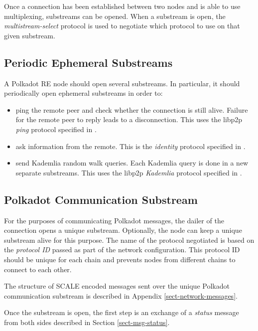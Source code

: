 \documentclass{book}
\newcommand{\tmem}[1]{{\em #1\/}}
\newcommand{\tmtextit}[1]{{\itshape{#1}}}
\providecommand{\tmem}[1]{\tmtextit{#1}}
\providecommand{\tmtextit}[1]{\tmtextit{#1}}
\begin{document}
Once a connection has been established between two nodes and is able to use
multiplexing, substreams can be opened. When a substream is open, the
{\tmem{multistream-select}} protocol is used to negotiate which protocol to
use on that given substream.

\subsection{Periodic Ephemeral Substreams}

A Polkadot RE node should open several substreams. In particular, it should
periodically open ephemeral substreams in order to:
\begin{itemize}
  \item ping the remote peer and check whether the connection is still alive.
  Failure for the remote peer to reply leads to a disconnection. This uses the
  libp2p {\tmem{ping}} protocol specified in
  {\cite{protocol_labs_libp2p_2019}}.
  
  \item ask information from the remote. This is the {\tmem{identity}}
  protocol specified in {\cite{protocol_labs_libp2p_2019}}.
  
  \item send Kademlia random walk queries. Each Kademlia query is done in a
  new separate substreams. This uses the libp2p {\tmem{Kademlia}} protocol
  specified in {\cite{protocol_labs_libp2p_2019}}.
\end{itemize}
\subsection{Polkadot Communication
Substream}\label{sect_polkadot_communication_substream}

For the purposes of communicating Polkadot messages, the dailer of the
connection opens a unique substream. Optionally, the node can keep a unique
substream alive for this purpose. The name of the protocol negotiated is based
on the {\tmem{protocol ID}} passed as part of the network configuration. This
protocol ID should be unique for each chain and prevents nodes from different
chains to connect to each other.

The structure of SCALE encoded messages sent over the unique Polkadot
communication substream is described in Appendix \ref{sect-network-messages}.

Once the substream is open, the first step is an exchange of a {\tmem{status}}
message from both sides described in Section \ref{sect-msg-status}.
\end{document}
